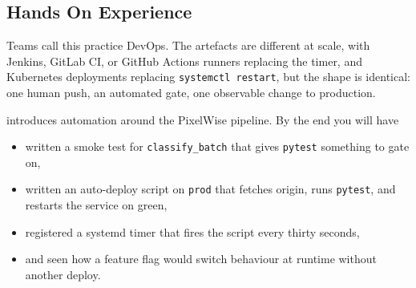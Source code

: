 \subsection{Hands On Experience} 
Teams call this practice DevOps.
The artefacts are different at scale, with Jenkins, GitLab CI, or
GitHub Actions runners replacing the timer, and Kubernetes
deployments replacing \texttt{systemctl restart}, but the shape is
identical: one human push, an automated gate, one observable change
to production.

 introduces automation around the
PixelWise pipeline.
By the end you will have
\begin{itemize}
    \item written a smoke test for \texttt{classify\_batch} that gives \texttt{pytest} something to gate on,
    \item written an auto-deploy script on \texttt{prod} that fetches origin, runs \texttt{pytest}, and restarts the service on green,
    \item registered a systemd timer that fires the script every thirty seconds,
    \item and seen how a feature flag would switch behaviour at runtime without another deploy.
\end{itemize}





